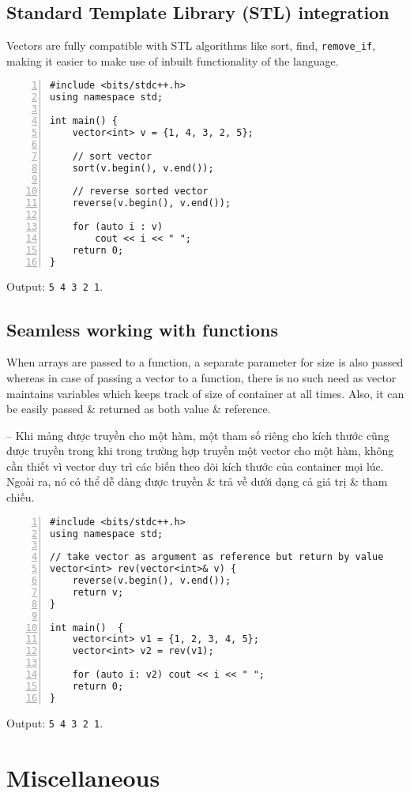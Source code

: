 \documentclass{article}
\begin{document}

\subsection{Standard Template Library (STL) integration}
Vectors are fully compatible with STL algorithms like sort, find, \verb|remove_if|, making it easier to make use of inbuilt functionality of the language.
\begin{Verbatim}[numbers=left,xleftmargin=5mm]
#include <bits/stdc++.h>
using namespace std;

int main() {
    vector<int> v = {1, 4, 3, 2, 5};
	
    // sort vector
    sort(v.begin(), v.end());
	
    // reverse sorted vector
    reverse(v.begin(), v.end());
	
    for (auto i : v)
        cout << i << " ";
    return 0;
}
\end{Verbatim}
Output: {\tt5 4 3 2 1}.


\subsection{Seamless working with functions}
When arrays are passed to a function, a separate parameter for size is also passed whereas in case of passing a vector to a function, there is no such need as vector maintains variables which keeps track of size of container at all times. Also, it can be easily passed \& returned as both value \& reference.

-- Khi mảng được truyền cho một hàm, một tham số riêng cho kích thước cũng được truyền trong khi trong trường hợp truyền một vector cho một hàm, không cần thiết vì vector duy trì các biến theo dõi kích thước của container mọi lúc. Ngoài ra, nó có thể dễ dàng được truyền \& trả về dưới dạng cả giá trị \& tham chiếu.
\begin{Verbatim}[numbers=left,xleftmargin=5mm]
#include <bits/stdc++.h> 
using namespace std;

// take vector as argument as reference but return by value
vector<int> rev(vector<int>& v) {
    reverse(v.begin(), v.end());
    return v;
}

int main()  { 
    vector<int> v1 = {1, 2, 3, 4, 5};
    vector<int> v2 = rev(v1);
    
    for (auto i: v2) cout << i << " ";
    return 0; 
}
\end{Verbatim}
Output: {\tt5 4 3 2 1}.


\section{Miscellaneous}


\printbibliography[heading=bibintoc]
	
\end{document}
